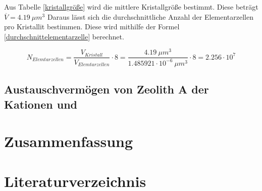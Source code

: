 \documentclass[12pt, a4paper]{article}
\begin{document}
\noindent 
Aus Tabelle \ref{kristallgröße} wird die mittlere Kristallgröße bestimmt. Diese beträgt $\overline{V} = 4.19 \: \mu m^3$
Daraus lässt sich die durchschnittliche Anzahl der Elementarzellen pro Kristallit bestimmen. Diese wird mithilfe der Formel \ref{durchschnittelementarzelle} berechnet.

\begin{equation}
  N_{Elemtarzellen} = \frac{V_{Kristall}}{V_{Elemtarzellen}} \cdot 8 = \frac{4.19 \: \mu m^3 }{1.485921 \cdot 10^{-6} \: \mu m^3} \cdot 8 =2.256 \cdot 10^{7}
  \label{durchschnittelementarzelle}
\end{equation}







\subsection{\texorpdfstring{Austauschvermögen von Zeolith A der Kationen  und }{Austauschvermögen von Zeolith A der Kationen Ca2+ und Na+}}









\newpage
\section{Zusammenfassung}




\newpage
\section{Literaturverzeichnis}
\printbibliography
\end{document}
